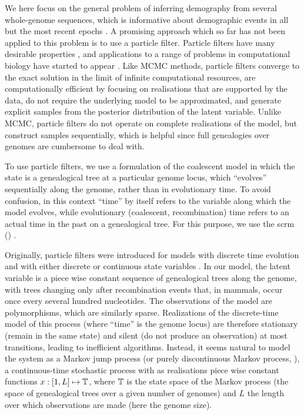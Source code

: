 We here focus on the general problem of inferring demography from several
whole-genome sequences,
which is informative about demographic events in all but the most recent epochs \cite{Schiffels2014b,Li2011a}.
A promising approach which so far has not been applied to this
problem is to use a particle filter.  Particle filters have many
desirable
properties \cite{Arulampalam2002,Doucet2000,Gordon1993},
and applications to a range of problems in computational biology have started to appear
\cite{L2020,M2018,RA2017,Taylor2014}.
Like MCMC methods, particle filters converge to the exact solution in
the limit of infinite computational resources, are computationally efficient by focusing on realisations that are 
supported by the data, do not require the underlying model to be
approximated, and generate explicit samples from the posterior distribution of the latent variable.
Unlike MCMC, particle filters do not operate on complete realisations
of the model, but construct samples sequentially, which is helpful
since full genealogies over genomes are cumbersome to deal with.

To use particle filters, we use a formulation of the coalescent model
in which the state is a genealogical tree at a particular genome
locus, which ``evolves'' sequentially along the genome, rather than in evolutionary
time.  To avoid confusion, in this context ``time'' by itself refers to
the variable along which the model evolves, while evolutionary
(coalescent, recombination) time refers to an actual time in the past
on a genealogical tree. For this purpose, we use the \gls{scrm} () \cite{Staab2015}.

Originally, particle filters were introduced for models with discrete time evolution
and with either discrete or continuous state variables
\cite{Rosenbluth2004,Gordon1993}.
In our model, the latent variable is a piece wise constant sequence of
genealogical trees along the genome, with trees changing only after
recombination events that, in mammals, occur once every several hundred nucleotides.
The observations of the model are polymorphisms, which are similarly sparse.
Realizations of the discrete-time model of this process (where ``time'' is
the genome locus) are therefore stationary (remain in the same state)
and silent (do not produce an observation) at most
transitions, leading to inefficient algorithms.
Instead, it seems natural to model the system as a
Markov jump process (or purely discontinuous Markov process, \cite{Feller1940}),
a continuous-time stochastic process with as realisations piece wise constant functions $x:[1,L]\mapsto\mathbb{T}$, where $\mathbb{T}$ is the state space of the Markov process (the
space of genealogical trees over a given number of genomes) and
$L$ the length over which observations are made (here the genome size).

